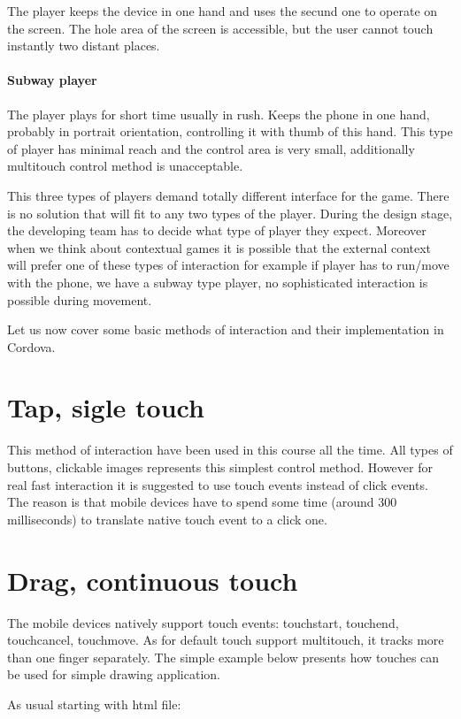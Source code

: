 The player keeps the device in one hand and uses the secund one to operate on the screen. The hole area of the screen is accessible, but the user cannot touch instantly two distant places.

\paragraph*{Subway player}

The player plays for short time usually in rush. Keeps the phone in one hand, probably in portrait orientation, controlling it with thumb of this hand. This type of player has minimal reach and the control area is very small, additionally  multitouch control method is unacceptable.

This three types of players demand totally different interface for the game. There is no solution that will fit to any two types of the player. During the design stage, the developing team has to decide what type of player they expect. Moreover when we think about contextual games it is possible that the external context will prefer one of these types of interaction for example if player has to run/move with the phone, we have a subway type player, no sophisticated  interaction is possible during movement.

Let us now cover some basic methods of interaction and their implementation in Cordova.

\section{Tap, sigle touch}
This method of interaction have been used in this course all the time. All types of buttons, clickable images represents this simplest control method. However for real fast interaction it is suggested to use touch events instead of click events. The reason is that mobile devices have to spend some time (around 300 milliseconds) to translate native touch event to a click one.

\section{Drag, continuous touch}
The mobile devices natively support touch events: touchstart, touchend, touchcancel, touchmove. As for default touch support multitouch, it tracks more than one finger separately. The simple example below presents how touches can be used for simple drawing application.

As usual starting with html file:

